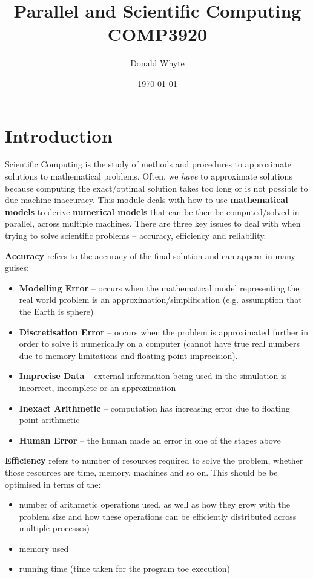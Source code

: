 \documentclass{article}
\title{Parallel and Scientific Computing \\ COMP3920}
\author{Donald Whyte}
\date{\today}
\begin{document}
\maketitle

\tableofcontents

\pagebreak
\listoffigures

\pagebreak
\listoftables

\pagebreak

\section{Introduction}

Scientific Computing is the study of methods and procedures to approximate solutions to mathematical problems. Often, we \textit{have} to approximate solutions because computing the exact/optimal solution takes too long or is not possible to due machine inaccuracy. This module deals with how to use \textbf{mathematical models} to derive \textbf{numerical models} that can be then be computed/solved in parallel, across multiple machines. There are three key issues to deal with when trying to solve scientific problems -- accuracy, efficiency and reliability.

\textbf{Accuracy} refers to the accuracy of the final solution and can appear in many guises:
\begin{itemize}
	\item \textbf{Modelling Error} -- occurs when the mathematical model representing the real world problem is an approximation/simplification (e.g. assumption that the Earth is  sphere)
	\item \textbf{Discretisation Error} -- occurs when the problem is approximated further in order to solve it numerically on a computer (cannot have true real numbers  due to memory limitations and floating point imprecision).
	\item \textbf{Imprecise Data} -- external information being used in the simulation is incorrect, incomplete or an approximation
	\item \textbf{Inexact Arithmetic} -- computation has increasing error due to floating point arithmetic
	\item \textbf{Human Error} -- the human made an error in one of the stages above
\end{itemize}

\textbf{Efficiency} refers to number of resources required to solve the problem, whether those resources are time, memory, machines and so on. This should be be optimised in terms of the:
\begin{itemize}
	\item number of arithmetic operations used, as well as how they grow with the problem size and how these operations can be efficiently distributed across multiple processes)
	\item memory used
	\item running time (time taken for the program toe execution)
\end{itemize}
\end{document}
